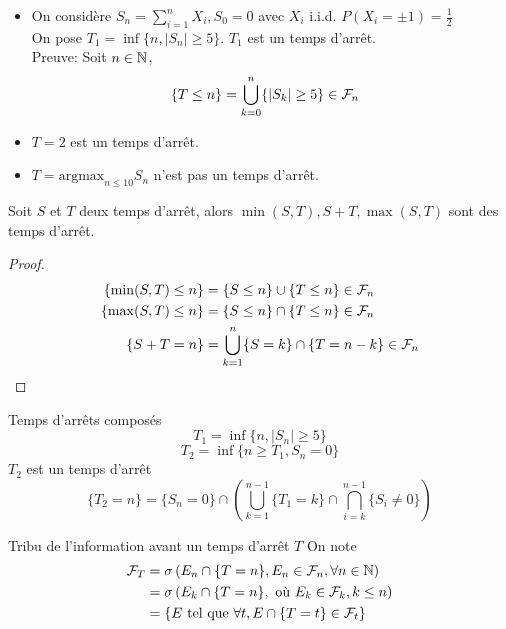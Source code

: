 \documentclass[]{report}
\begin{document}
    \begin{ex}{}{}
        \begin{itemize}
            \item On considère $S_n=\sum_{i=1}^{n}X_i,S_0=0$ avec $X_i$ i.i.d. $P(X_i=\pm 1)=\frac{1}{2}$\\
            On pose $T_1=\inf \{n,|S_n|\ge 5\}$. $T_1$ est un temps d'arrêt.\\
            Preuve: Soit $n\in \mathbb{N}$,
            \begin{align*}
                \{T\le n\}&=\bigcup_{k=0}^n\{|S_k|\ge 5\}\in \mathcal{F}_n
            \end{align*}
            \item $T=2$ est un temps d'arrêt.
            \item $T=\text{argmax}_{n\le 10} S_n$ n'est pas un temps d'arrêt.
        \end{itemize}
    \end{ex}

    \begin{prop}{}{}
        Soit $S$ et $T$ deux temps d'arrêt, alors $\min(S,T),S+T,\max(S,T)$ sont des temps d'arrêt.
    \end{prop}

    \begin{proof}
        \begin{align*}
            \{\min(S,T)\le n\}&=\{S\le n\}\cup \{T\le n\}\in \mathcal{F}_n\\
            \{\max(S,T)\le n\}&=\{S\le n\}\cap \{T\le n\}\in \mathcal{F}_n\\
            \{S+T=n\}&=\bigcup_{k=1}^n \{S=k\}\cap \{T=n-k\}\in \mathcal{F}_n
        \end{align*}
    \end{proof}

    \begin{ex}{Temps d'arrêts composés}{}
        \[T_1=\inf \{n,|S_n|\ge 5\}\]
        \[T_2=\inf\{ n\ge T_1, S_n=0\}\]
        $T_2$ est un temps d'arrêt
        \[\{T_2=n\}=\{S_n=0\}\cap\left(\bigcup_{k=1}^{n-1}\{T_1=k\}\cap \bigcap_{i=k}^{n-1}\{S_i\neq 0\}\right)\]
    \end{ex}

    \begin{df}{Tribu de l'information avant un temps d'arrêt $T$}{}
        On note 
        \begin{align*}
            \mathcal{F}_T&=\sigma\left(E_n\cap\{T=n\},E_n\in \mathcal{F}_n,\forall n\in \mathbb{N}\right)\\
            &=\sigma\left(E_k\cap\{T=n\},\text{ où }E_k\in \mathcal{F}_k,k\le n\right)\\
            &=\{E\text{ tel que }\forall t,E\cap \{T=t\}\in \mathcal{F}_t\}
        \end{align*}
    \end{df}
\end{document}
